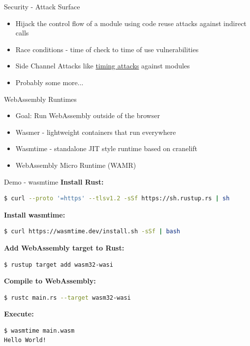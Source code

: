 \documentclass{beamer}
\begin{document}
\begin{frame}{Security - Attack Surface}
    \begin{itemize}
        \item Hijack the control flow of a module using code reuse attacks against indirect calls
        \item Race conditions - time of check to time of use vulnerabilities
        \item Side Channel Attacks like \href{https://github.com/tc39/ecmascript_sharedmem/blob/master/issues/TimingAttack.md}{timing attacks} against modules
        \item Probably some more...
    \end{itemize}
\end{frame}

\begin{frame}{WebAssembly Runtimes}
    \begin{itemize}
        \item Goal: Run WebAssembly outside of the browser
        \item Wasmer - lightweight containers that run everywhere
        \item Wasmtime - standalone JIT style runtime based on cranelift
        \item WebAssembly Micro Runtime (WAMR)
    \end{itemize}
\end{frame}

\begin{frame}[fragile]{Demo - wasmtime}
    \textbf{Install Rust:}
    \begin{lstlisting}[language=bash,basicstyle=\scriptsize]
$ curl --proto '=https' --tlsv1.2 -sSf https://sh.rustup.rs | sh
    \end{lstlisting}

    \textbf{Install wasmtime:}
    \begin{lstlisting}[language=bash,basicstyle=\scriptsize]
$ curl https://wasmtime.dev/install.sh -sSf | bash
    \end{lstlisting}

    \textbf{Add WebAssembly target to Rust:}
    \begin{lstlisting}[language=bash,basicstyle=\scriptsize]
$ rustup target add wasm32-wasi
    \end{lstlisting}

    \textbf{Compile to WebAssembly:}
    \begin{lstlisting}[language=bash,basicstyle=\scriptsize]
$ rustc main.rs --target wasm32-wasi
    \end{lstlisting}

    \textbf{Execute:}
    \begin{lstlisting}[language=bash,basicstyle=\scriptsize]
$ wasmtime main.wasm
Hello World!
    \end{lstlisting}
\end{frame}
\end{document}
